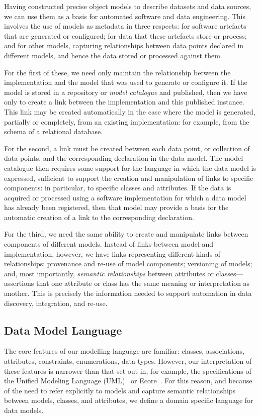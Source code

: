 Having constructed precise object models to describe datasets and data
sources, we can use them as a basis for automated software and data
engineering.  This involves the use of models as metadata in three
respects: for software artefacts that are generated or configured; for
data that these artefacts store or process; and for other models,
capturing relationships between data points declared in different
models, and hence the data stored or processed against them.

For the first of these, we need only maintain the relationship between
the implementation and the model that was used to generate or
configure it.  If the model is stored in a repository or \emph{model
  catalogue} and published, then we have only to create a link between
the implementation and this published instance.  This link may be
created automatically in the case where the model is generated,
partially or completely, from an existing implementation: for example,
from the schema of a relational database.

For the second, a link must be created between each data point, or
collection of data points, and the corresponding declaration in the
data model.  The model catalogue then requires some support for the
language in which the data model is expressed, sufficient to support
the creation and manipulation of links to specific components: in
particular, to specific classes and attributes.  If the data is
acquired or processed using a software implementation for which a data
model has already been registered, then that model may provide a basis
for the automatic creation of a link to the corresponding declaration.

For the third, we need the same ability to create and manipulate links
between components of different models.  Instead of links between
model and implementation, however, we have links representing
different kinds of relationships: provenance and re-use of model
components; versioning of models; and, most importantly,
\emph{semantic relationships} between attributes or
classes---assertions that one attribute or class has the same meaning
or interpretation as another.  This is precisely the information
needed to support automation in data discovery, integration, and
re-use.

\subsection{Data Model Language}

The core features of our modelling language are familiar: classes,
associations, attributes, constraints, enumerations, data types.
However, our interpretation of these features is narrower than that
set out in, for example, the specifications of the Unified Modeling
Language (UML)~\cite{UML} or Ecore~\cite{ECORE}.  For this reason, and
because of the need to refer explicitly to models and capture semantic
relationships between models, classes, and attributes, we define a
domain specific language for data models.

